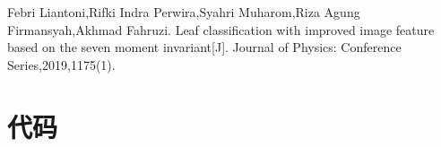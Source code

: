 \documentclass{whutmod}
\begin{document}
 
	\newpage	%
	\nocite{*}		%
%
%	
\begin{thebibliography}{9}%
	Febri Liantoni,Rifki Indra Perwira,Syahri Muharom,Riza Agung Firmansyah,Akhmad Fahruzi. Leaf classification with improved image feature based on the seven moment invariant[J]. Journal of Physics: Conference Series,2019,1175(1).

\end{thebibliography}

	\newpage
	\appendix %

\section{代码}
\end{document}
